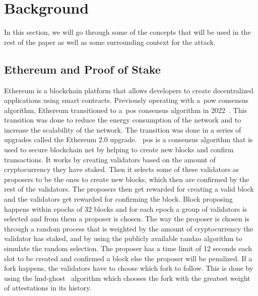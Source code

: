 
\section{Background}\label{sec:background}
In this section, we will go through some of the concepts that will be used in the rest of the paper as well as some surrounding context for the attack.

\subsection{Ethereum and Proof of Stake}\label{subsec:ethereum-and-proof-of-stake}
Ethereum is a blockchain platform that allows developers to create decentralized applications using smart contracts.
Previously operating with a~\gls{pow} consensus algorithm, Ethereum transitioned to a~\gls{pos} consensus algorithm in 2022~\cite{EthereumProof-of-stakePoS}.
This transition was done to reduce the energy consumption of the network and to increase the scalability of the network.
The transition was done in a series of upgrades called the Ethereum 2.0 upgrade.
~\gls{pos} is a consensus algorithm that is used to secure blockchain net by helping to create new blocks and confirm transactions.
It works by creating validators based on the amount of cryptocurrency they have staked.
Then it selects some of these validators as proposers to be the ones to create new blocks, which then are confirmed by the rest of the validators.
The proposers then get rewarded for creating a valid block and the validators get rewarded for confirming the block.
Block proposing happens within epochs of 32 blocks and for each epoch a group of validators is selected and from them a proposer is chosen.
The way the proposer is chosen is through a random process that is weighted by the amount of cryptocurrency the validator has staked, and by using the publicly available \gls{randao} algorithm to simulate the random selection.
The proposer has a time limit of 12 seconds each slot to be created and confirmed a block else the proposer will be penalized.
If a fork happens, the validators have to choose which fork to follow.
This is done by using the \gls{lmd-ghost}~\cite{EthereumProof-of-stakePoS} algorithm which chooses the fork with the greatest weight of attestations in its history.

